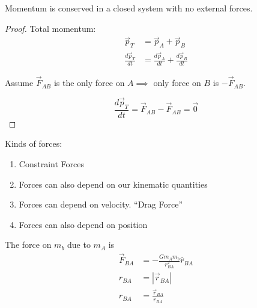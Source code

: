 \documentclass[10pt]{scrartcl}
\begin{document}
\begin{theorem}
	Momentum is conserved in a closed system with no external forces.
\end{theorem}

\begin{proof}
Total momentum:
\[\begin{aligned}
\vec{p}_T &= \vec{p}_A + \vec{p}_B\\
\frac{d\vec{p}_T}{dt} &= \frac{d\vec{p}_A}{dt} + \frac{d\vec{p}_B}{dt}	
\end{aligned}
\]

Assume $\vec{F}_{AB}$ is the only force on $A \implies$ only force on $B$ is $-\vec{F}_{AB}$. 

\[\frac{d\vec{p}_T}{dt} = \vec{F}_{AB} - \vec{F}_{AB} = \vec{0}\]
\end{proof}



Kinds 
 of forces:
\begin{enumerate}
\item Constraint Forces
\item Forces can also depend on our kinematic quantities
\item Forces can depend on velocity. ``Drag Force''
\item Forces can also depend on position	
\end{enumerate}


  \begin{center}
  \end{center}

The force on $m_b$ due to $m_A$ is 
\[
\begin{aligned}
\vec{F}_{BA} &= -\frac{Gm_Am_b}{r^2_{BA}}\hat{r}_{BA}\\
r_{BA} &= |\vec{r}_{BA}|\\
\hat{r}_{BA} &= \frac{\vec{r}_{BA}}{r_{BA}}
\end{aligned}
\]
\end{document}
